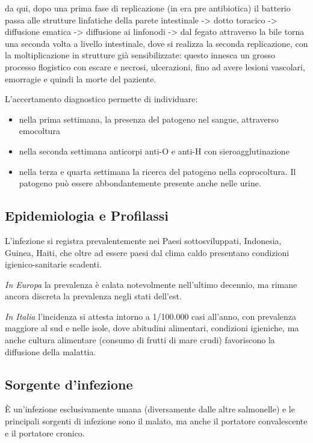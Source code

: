 da qui, dopo una prima fase di replicazione (in era pre antibiotica) il
batterio passa alle strutture linfatiche della parete intestinale -> dotto
toracico -> diffusione ematica -> diffusione ai linfonodi -> dal fegato
attraverso la bile torna una seconda volta a livello intestinale, dove
si realizza la seconda replicazione, con la moltiplicazione in strutture
già sensibilizzate: questo innesca un grosso processo flogistico con
escare e necrosi, ulcerazioni, fino ad avere lesioni vascolari,
emorragie e quindi la morte del paziente.

L'accertamento diagnostico permette di individuare:

\begin{itemize}
\item
  nella prima settimana, la presenza del patogeno nel sangue, attraverso
  emocoltura
\item
  nella seconda settimana anticorpi anti-O e anti-H con
  sieroagglutinazione
\item
  nella terza e quarta settimana la ricerca del patogeno nella
  coprocoltura. Il patogeno può essere abbondantemente presente anche
  nelle urine.
\end{itemize}

\subsection{Epidemiologia e Profilassi}


L'infezione si registra prevalentemente nei Paesi sottosviluppati,
Indonesia, Guinea, Haiti, che oltre ad essere paesi dal clima caldo
presentano condizioni igienico-sanitarie scadenti.

\emph{In Europa} la prevalenza è calata notevolmente nell'ultimo
decennio, ma rimane ancora discreta la prevalenza negli stati dell'est.

\emph{In Italia} l'incidenza si attesta intorno a 1/100.000 casi
all'anno, con prevalenza maggiore al sud e nelle isole, dove abitudini
alimentari, condizioni igieniche, ma anche cultura alimentare (consumo
di frutti di mare crudi) favoriscono la diffusione della malattia.

\subsection{Sorgente d'infezione}


È un'infezione esclusivamente umana (diversamente dalle altre
salmonelle) e le principali sorgenti di infezione sono il malato, ma
anche il portatore convalescente e il portatore cronico.


